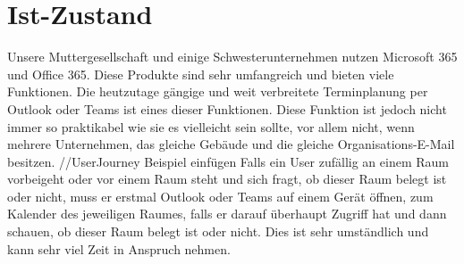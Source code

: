 


\pagebreak
\section{Ist-Zustand}
Unsere Muttergesellschaft und einige Schwesterunternehmen nutzen Microsoft 365 und Office 365. Diese Produkte sind sehr umfangreich und bieten viele Funktionen. Die heutzutage gängige und weit verbreitete Terminplanung per Outlook oder Teams ist eines dieser Funktionen. Diese Funktion ist jedoch nicht immer so praktikabel wie sie es vielleicht sein sollte, vor allem nicht, wenn mehrere Unternehmen, das gleiche Gebäude und die gleiche Organisations-E-Mail besitzen.
\newline
//UserJourney Beispiel einfügen
\newline
Falls ein User zufällig an einem Raum vorbeigeht oder vor einem Raum steht und sich fragt, ob dieser Raum belegt ist oder nicht, muss er erstmal Outlook oder Teams auf einem Gerät öffnen, zum Kalender des jeweiligen Raumes, falls er darauf überhaupt Zugriff hat und dann schauen, ob dieser Raum belegt ist oder nicht.
Dies ist sehr umständlich und kann sehr viel Zeit in Anspruch nehmen.

